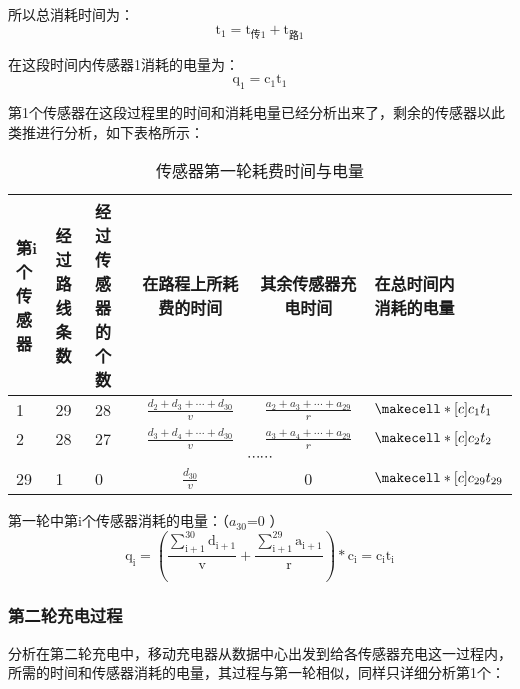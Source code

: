 \documentclass{article}
\begin{document}
所以总消耗时间为：
$$\mathrm{t_1=t_{\text {传1}}+t_{\text {路1}}}$$

在这段时间内传感器1消耗的电量为：
$$\mathrm{q_1=c_1 t_1}$$

第1个传感器在这段过程里的时间和消耗电量已经分析出来了，剩余的传感器以此类推进行分析，如下表格所示：
\vspace{1ex}
\begin{table}[h]
    \begin{center} 
        \begin{tabular}{|p{1.5cm}<{\centering}|p{1.5cm}<{\centering}|p{1.5cm}<{\centering}|c|c|p{2cm}<{\centering}|}
            \hline
            \makecell*[c]{第i个\\传感器} & \makecell*[c]{经过路\\线条数} & \makecell*[c]{经过传感\\器的个数}  & 在路程上所耗费的时间            & 其余传感器充电时间             & \makecell*[c]{在总时间内\\消耗的电量}  \\ 
            \hline
            1      & 29     & 28       & $\frac{d_{2}+d_{3}+\cdots+d_{30}}{v}$ & $\frac{a_{2}+a_{3}+\cdots+a_{29}}{r}$  &  $\makecell*[c]{c_1 t_1}$   \\ 
            \hline
            2      & 28     & 27       & $\frac{d_{3}+d_{4}+\cdots+d_{30}}{v}$ & $\frac{a_{3}+a_{4}+\cdots+a_{29}}{r}$  &  $\makecell*[c]{c_2 t_2}$  \\ 
            \hline
            \multicolumn{6}{|c|}{$\cdots \cdots$}                                                                 \\ 
            \hline
            29     & 1      & 0        & $\frac{d_{30}}{v}$     &  0  &  $\makecell*[c]{c_{29} t_{29}}$ \\
            \hline
        \end{tabular}
    \end{center}
\caption{传感器第一轮耗费时间与电量}
\end{table}

第一轮中第i个传感器消耗的电量：（$a_{30}$=0 ）
\begin{equation}
    \mathrm{q_i=\left(\frac{\sum_{i+1}^{30} d_{i+1}}{v}+\frac{\sum_{i+1}^{29} a_{i+1}}{r}\right) * c_i=c_i t_i}
    \tag{14}
\end{equation}

\subsubsection{第二轮充电过程}
分析在第二轮充电中，移动充电器从数据中心出发到给各传感器充电这一过程内，所需的时间和传感器消耗的电量，其过程与第一轮相似，同样只详细分析第1个：
\end{document}
